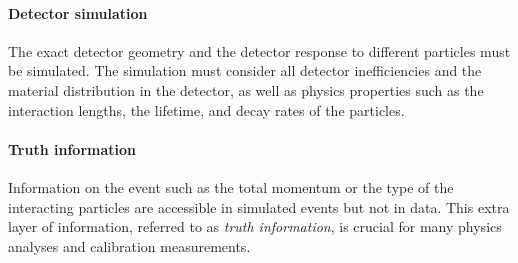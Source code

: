 \paragraph{Detector simulation}
The exact detector geometry and the detector response to different particles must be simulated.
The simulation must consider all detector inefficiencies and the material distribution in the detector, as well as physics properties such as the interaction lengths, the lifetime, and decay rates of the particles.

\paragraph{Truth information}
Information on the event such as the total momentum or the type of the interacting particles are accessible in simulated events but not in data. This extra layer of information, referred to as \emph{truth information}, is crucial for many physics analyses and calibration measurements.








